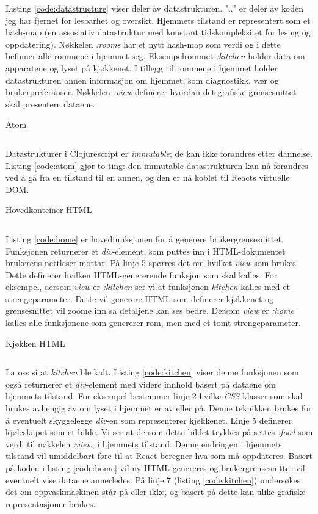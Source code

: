 Listing \ref{code:datastructure} viser deler av datastrukturen. ".." er deler av koden jeg har fjernet for lesbarhet og oversikt. Hjemmets tilstand er representert som et hash-map (en assosiativ datastruktur med konstant tidskompleksitet for lesing og oppdatering). Nøkkelen \emph{:rooms} har et nytt hash-map som verdi og i dette befinner alle rommene i hjemmet seg. Eksempelrommet \emph{:kitchen} holder data om apparatene og lyset på kjøkkenet. I tillegg til rommene i hjemmet holder datastrukturen annen informasjon om hjemmet, som diagnostikk, vær og brukerpreferanser. Nøkkelen \emph{:view} definerer hvordan det grafiske grensesnittet skal presentere dataene.  
\begin{listing}[ht]
\caption{Atom}
\inputminted[fontsize=\footnotesize, linenos]{clj}{kodesnutter/atom.clj}
\label{code:atom}
\end{listing}
Datastrukturer i Clojurescript er \emph{immutable}; de kan ikke forandres etter dannelse. Listing \ref{code:atom} gjør to ting: den immutable datastrukturen kan nå forandres ved å gå fra en tilstand til en annen, og den er nå koblet til Reacts virtuelle DOM.
\begin{listing}[ht]
\caption{Hovedkonteiner HTML}
\inputminted[fontsize=\footnotesize, linenos]{clj}{kodesnutter/home.clj}
\label{code:home}
\end{listing}
Listing \ref{code:home} er hovedfunksjonen for å generere brukergrensesnittet. Funksjonen returnerer et \emph{div}-element, som puttes inn i HTML-dokumentet brukerens nettleser mottar. På linje 5 spørres det om hvilket \emph{view} som brukes. Dette definerer hvilken HTML-genererende funksjon som skal kalles. For eksempel, dersom \emph{view} er \emph{:kitchen} ser vi at funksjonen \emph{kitchen} kalles med et strengeparameter. Dette vil generere HTML som definerer kjøkkenet og grensesnittet vil zoome inn så detaljene kan ses bedre. Dersom \emph{view} er \emph{:home} kalles alle funksjonene som genererer rom, men med et tomt strengeparameter.
\begin{listing}[ht]
\caption{Kjøkken HTML}
\inputminted[fontsize=\footnotesize, linenos]{clj}{kodesnutter/kitchen.clj}
\label{code:kitchen}
\end{listing}
La oss si at \emph{kitchen} ble kalt. Listing \ref{code:kitchen} viser denne funksjonen som også returnerer et \emph{div}-element med videre innhold basert på dataene om hjemmets tilstand. For eksempel bestemmer linje 2 hvilke \emph{CSS}-klasser som skal brukes avhengig av om lyset i hjemmet er av eller på. Denne teknikken brukes for å eventuelt skyggelegge \emph{div}-en som representerer kjøkkenet. Linje 5 definerer kjøleskapet som et bilde. Vi ser at dersom dette bildet trykkes på settes \emph{:food} som verdi til nøkkelen \emph{:view}, i hjemmets tilstand. Denne endringen i hjemmets tilstand vil umiddelbart føre til at React beregner hva som må oppdateres. Basert på koden i listing \ref{code:home} vil ny HTML genereres og brukergrensesnittet vil eventuelt vise dataene annerledes. På linje 7 (listing \ref{code:kitchen}) undersøkes det om oppvaskmaskinen står på eller ikke, og basert på dette kan ulike grafiske representasjoner brukes.
